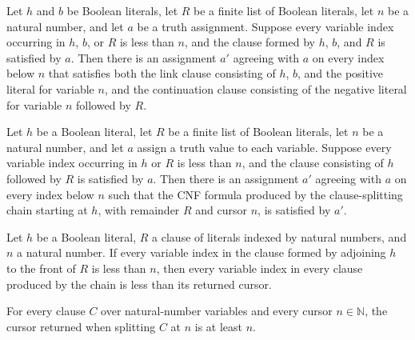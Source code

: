 \begin{lemma}
\label{Complexity.satChain_extend_step}
\leanok
{}
Let $h$ and $b$ be Boolean literals, let $R$ be a finite list of Boolean literals, let
$n$ be a natural number, and let $a$ be a truth assignment. Suppose every variable index
occurring in $h$, $b$, or $R$ is less than $n$, and the clause formed by $h$, $b$, and
$R$ is satisfied by $a$. Then there is an assignment $a'$ agreeing with $a$ on every
index below $n$ that satisfies both the link clause consisting of $h$, $b$, and the
positive literal for variable $n$, and the continuation clause consisting of the
negative literal for variable $n$ followed by $R$.
\end{lemma}

\begin{lemma}
\label{Complexity.satChain_complete}
\leanok
{}
Let $h$ be a Boolean literal, let $R$ be a finite list of Boolean literals, let $n$ be a
natural number, and let $a$ assign a truth value to each variable. Suppose every
variable index occurring in $h$ or $R$ is less than $n$, and the clause consisting of
$h$ followed by $R$ is satisfied by $a$. Then there is an assignment $a'$ agreeing with
$a$ on every index below $n$ such that the CNF formula produced by the clause-splitting
chain starting at $h$, with remainder $R$ and cursor $n$, is satisfied by $a'$.
\end{lemma}

\begin{lemma}
\label{Complexity.satChain_vars}
\leanok
{}
Let $h$ be a Boolean literal, $R$ a clause of literals indexed by natural numbers, and
$n$ a natural number. If every variable index in the clause formed by adjoining $h$ to
the front of $R$ is less than $n$, then every variable index in every clause produced by
the chain is less than its returned cursor.
\end{lemma}

\begin{lemma}
\label{Complexity.satSplitClause_cursor}
\leanok
{}
For every clause $C$ over natural-number variables and every cursor $n\in\mathbb{N}$,
the cursor returned when splitting $C$ at $n$ is at least $n$.
\end{lemma}

